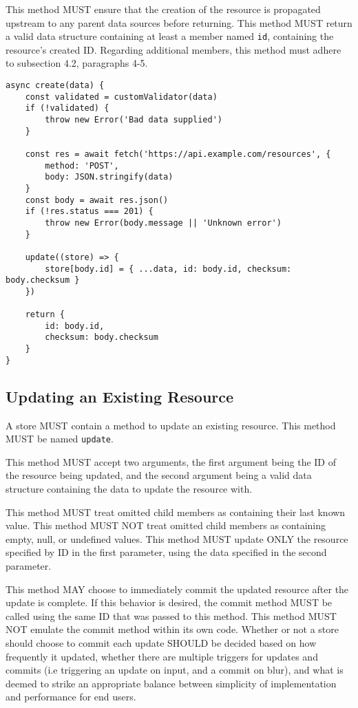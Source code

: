\documentclass{article}
\begin{document}
This method MUST ensure that the creation of the resource is propagated upstream to any parent data sources before returning. This method MUST return a valid data structure containing at least a member named \verb|id|, containing the resource's created ID. Regarding additional members, this method must adhere to subsection 4.2, paragraphs 4-5.

\begin{lstlisting}[caption=Create Method]
async create(data) {
    const validated = customValidator(data)
    if (!validated) {
        throw new Error('Bad data supplied')
    }
    
    const res = await fetch('https://api.example.com/resources', {
        method: 'POST',
        body: JSON.stringify(data)
    }
    const body = await res.json()
    if (!res.status === 201) {
        throw new Error(body.message || 'Unknown error')
    }
    
    update((store) => {
        store[body.id] = { ...data, id: body.id, checksum: body.checksum }
    })
    
    return {
        id: body.id,
        checksum: body.checksum
    }
}
\end{lstlisting}

\subsection{Updating an Existing Resource}
A store MUST contain a method to update an existing resource. This method MUST be named \verb|update|.

This method MUST accept two arguments, the first argument being the ID of the resource being updated, and the second argument being a valid data structure containing the data to update the resource with.

This method MUST treat omitted child members as containing their last known value. This method MUST NOT treat omitted child members as containing empty, null, or undefined values. This method MUST update ONLY the resource specified by ID in the first parameter, using the data specified in the second parameter.

This method MAY choose to immediately commit the updated resource after the update is complete. If this behavior is desired, the commit method MUST be called using the same ID that was passed to this method. This method MUST NOT emulate the commit method within its own code. Whether or not a store should choose to commit each update SHOULD be decided based on how frequently it updated, whether there are multiple triggers for updates and commits (i.e triggering an update on input, and a commit on blur), and what is deemed to strike an appropriate balance between simplicity of implementation and performance for end users.
\end{document}
